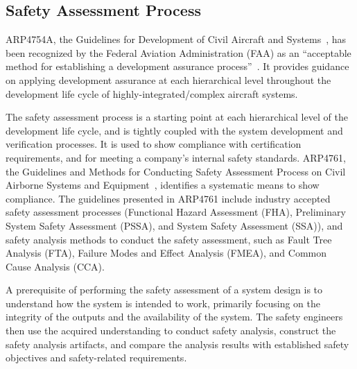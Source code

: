 \subsection{Safety Assessment Process}
\label{subsec:process}

ARP4754A, the Guidelines for Development of Civil Aircraft and Systems~\cite{SAE:ARP4754A}, has been recognized by the Federal Aviation Administration (FAA) as an ``acceptable method for establishing a development assurance process''~\cite{AC:20-174}. It provides guidance on applying development assurance at each hierarchical level throughout the development life cycle of highly-integrated/complex aircraft systems.


The safety assessment process is a starting point at each hierarchical level of the development life cycle, and is tightly coupled with the system development and verification processes. It is used to show compliance with certification requirements, and for meeting a company's internal safety standards. ARP4761, the Guidelines and Methods for Conducting Safety Assessment Process on Civil Airborne Systems and Equipment~\cite{SAE:ARP4761},  identifies a systematic means to show compliance. The guidelines presented in ARP4761 include industry accepted safety assessment processes (Functional Hazard Assessment (FHA), Preliminary System Safety Assessment (PSSA), and System Safety Assessment (SSA)), and safety analysis methods to conduct the safety assessment, 
such as Fault Tree Analysis (FTA), Failure Modes and Effect Analysis (FMEA), and Common Cause Analysis (CCA).

A prerequisite of performing the safety assessment of a system design is to understand how the system is intended to work, primarily focusing on the integrity of the outputs and the availability of the system. The safety engineers then use the acquired understanding to conduct safety analysis, construct the safety analysis artifacts, and compare the analysis results with established safety objectives and safety-related requirements. 


